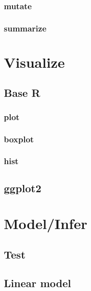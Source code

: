 \documentclass[
  12pt,
]{book}
\begin{document}
\hypertarget{mutate}{%
\section{mutate}\label{mutate}}

\hypertarget{summarize}{%
\section{summarize}\label{summarize}}

\hypertarget{part-visualize}{%
\part{Visualize}\label{part-visualize}}

\hypertarget{base-r}{%
\chapter{Base R}\label{base-r}}

\hypertarget{plot}{%
\section{plot}\label{plot}}

\hypertarget{boxplot}{%
\section{boxplot}\label{boxplot}}

\hypertarget{hist}{%
\section{hist}\label{hist}}

\hypertarget{ggplot2}{%
\chapter{ggplot2}\label{ggplot2}}

\hypertarget{part-modelinfer}{%
\part{Model/Infer}\label{part-modelinfer}}

\hypertarget{test}{%
\chapter{Test}\label{test}}

\hypertarget{linear-model}{%
\chapter{Linear model}\label{linear-model}}
\end{document}
